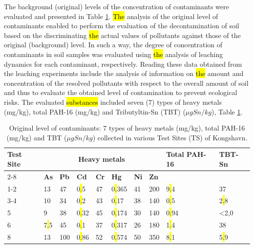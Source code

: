 \documentclass[algorithms,article,submit,pdftex,moreauthors]{Definitions/mdpi}
\begin{document}
The background (original) levels of the concentration of contaminants were evaluated and presented in Table \ref{tab03}. \hl{The} analysis of the original level of contaminants enabled to perform the evaluation of the decontamination of soil based on the discriminating \hl{the }actual values of pollutants against those of the original (background) level. In such a way, the degree of concentration of contaminants in soil samples was evaluated using \hl{the }analysis of leaching dynamics for each contaminant, respectively. Reading these data obtained from the leaching experiments include the analysis of information on \hl{the }amount and concentration of the resolved pollutants with respect to the overall amount of soil and thus to evaluate the obtained level of contamination to prevent ecological risks. The evaluated \hl{substances} included seven (7) types of heavy metals (mg/kg), total PAH-16 (mg/kg) and Tributyltin-Sn (TBT) ($\mu g Sn/kg$), Table \ref{tab03}. 

\begin{table}[H] 
\setcellgapes{1pt}
\makegapedcells
\caption{Original level of contaminants: 7 types of heavy metals (mg/kg), total PAH-16 (mg/kg) and TBT ($\mu g Sn/kg$) collected in various Test Sites (TS) of Kongshavn.\label{tab03}}
\begin{tabularx}{\textwidth}{p{1.2cm} p{0.8cm} p{0.8cm} p{0.8cm}p{0.8cm}p{0.8cm}p{0.8cm}p{0.8cm}p{2.0cm}p{1.2cm}}
\toprule
\multirow{2}{*}{\textbf{Test Site}} & \multicolumn{7}{c}{\textbf{Heavy metals}} & \multirow{2}{*}{\textbf{Total PAH-16}} & \multirow{2}{*}{\textbf{TBT-Sn}}\\ \cline{2-8}
& \textbf{As} & \textbf{Pb} & \textbf{Cd} & \textbf{Cr} & \textbf{Hg} & \textbf{Ni} & \textbf{Zn} & & \\
\midrule
	1-2 	& 13	& 47 & 0\hl{.}5 & 47 & 0\hl{.}365 & 41 & 200 & 9\hl{.}4 & 37 \\
	3-4 & 10	& 34 & 0\hl{.}2 & 43 & 0\hl{.}17 & 38 & 140 & 0\hl{.}5 & 2\hl{.}8 \\
	5 &    9	& 38 & 0\hl{.}32 & 45 & 0\hl{.}174 & 30 & 140 & 0\hl{.}94 & <2,0 \\
	6 &   7\hl{.}5	& 45 & 0\hl{.}1 & 37 & 0\hl{.}317 & 26 & 180 & 1\hl{.}4 & 38 \\
	8 &   13	& 100 & 0\hl{.}86 & 52 & 0\hl{.}574 & 50 & 350 & 8\hl{.}1 & 5\hl{.}9 \\
\bottomrule
\end{tabularx}
\end{table}
\end{document}
